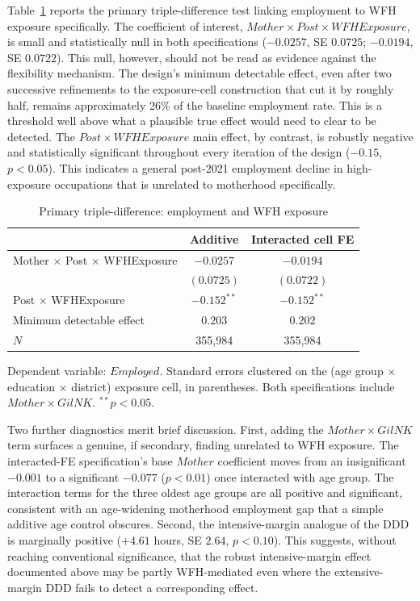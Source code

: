 \documentclass[11pt]{article}
\begin{document}
Table~\ref{tab:ddd} reports the primary triple-difference test linking employment to WFH exposure specifically. The coefficient of interest, $Mother\times Post\times WFHExposure$, is small and statistically null in both specifications ($-0.0257$, SE $0.0725$; $-0.0194$, SE $0.0722$). This null, however, should not be read as evidence against the flexibility mechanism. The design's minimum detectable effect, even after two successive refinements to the exposure-cell construction that cut it by roughly half, remains approximately 26\% of the baseline employment rate. This is a threshold well above what a plausible true effect would need to clear to be detected. The $Post\times WFHExposure$ main effect, by contrast, is robustly negative and statistically significant throughout every iteration of the design ($-0.15$, $p<0.05$). This indicates a general post-2021 employment decline in high-exposure occupations that is unrelated to motherhood specifically.

\begin{table}[htbp]
\centering
\caption{Primary triple-difference: employment and WFH exposure}
\label{tab:ddd}
\begin{tabular}{lcc}
\hline
 & Additive & Interacted cell FE \\
\hline
Mother $\times$ Post $\times$ WFHExposure & $-0.0257$ & $-0.0194$ \\
 & $(0.0725)$ & $(0.0722)$ \\
Post $\times$ WFHExposure & $-0.152^{**}$ & $-0.152^{**}$ \\
\hline
Minimum detectable effect & $0.203$ & $0.202$ \\
$N$ & 355{,}984 & 355{,}984 \\
\hline
\end{tabular}
\par\smallskip
{\footnotesize Dependent variable: $Employed$. Standard errors clustered on the (age group $\times$ education $\times$ district) exposure cell, in parentheses. Both specifications include $Mother\times GilNK$. $^{**}p<0.05$.}
\end{table}

Two further diagnostics merit brief discussion. First, adding the $Mother\times GilNK$ term surfaces a genuine, if secondary, finding unrelated to WFH exposure. The interacted-FE specification's base $Mother$ coefficient moves from an insignificant $-0.001$ to a significant $-0.077$ ($p<0.01$) once interacted with age group. The interaction terms for the three oldest age groups are all positive and significant, consistent with an age-widening motherhood employment gap that a simple additive age control obscures. Second, the intensive-margin analogue of the DDD is marginally positive ($+4.61$ hours, SE $2.64$, $p<0.10$). This suggests, without reaching conventional significance, that the robust intensive-margin effect documented above may be partly WFH-mediated even where the extensive-margin DDD fails to detect a corresponding effect.
\end{document}
